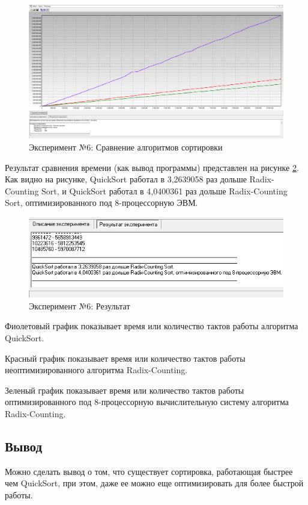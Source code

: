 \clearpage

\begin{figure}[h]
	\centering
	\includegraphics[height=0.35\textheight]{img/t6}
	\caption{Эксперимент №6: Сравнение алгоритмов сортировки}
	\label{ex:t6}
\end{figure}

Результат сравнения времени (как вывод программы) представлен на рисунке \ref{ex:t6-data}. Как видно на рисунке, QuickSort работал в 3,2639058 раз дольше Radix-Counting Sort, и QuickSort работал в 4,0400361 раз дольше Radix-Counting Sort, оптимизированного под 8-процессорную ЭВМ.

\begin{figure}[h]
	\centering
	\includegraphics[height=0.15\textheight]{img/t6-data}
	\caption{Эксперимент №6: Результат}
	\label{ex:t6-data}
\end{figure}

Фиолетовый график показывает время или количество тактов работы алгоритма QuickSort. 

Красный график показывает время или количество тактов работы неоптимизированного алгоритма Radix-Counting. 

Зеленый график показывает время или количество тактов работы оптимизированного под 8-процессорную вычислительную систему алгоритма Radix-Counting.

\subsection*{Вывод}
Можно сделать вывод о том, что существует сортировка, работающая быстрее чем QuickSort, при этом, даже ее можно еще оптимизировать для более быстрой работы.

